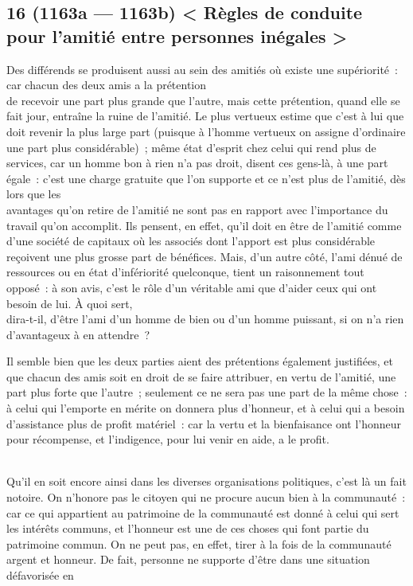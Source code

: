 \documentclass[french,twoside]{book} %
\begin{document}
\subsection[{16 (1163a — 1163b) < Règles de conduite pour l’amitié entre personnes inégales >}]{16 (1163a — 1163b) < Règles de conduite pour l’amitié entre personnes inégales >}
\noindent Des différends se produisent aussi au sein des amitiés où existe une supériorité : car chacun des deux amis a la prétention \\
de recevoir une part plus grande que l’autre, mais cette prétention, quand elle se fait jour, entraîne la ruine de l’amitié. Le plus vertueux estime que c’est à lui que doit revenir la plus large part (puisque à l’homme vertueux on assigne d’ordinaire une part plus considérable) ; même état d’esprit chez celui qui rend plus de services, car un homme bon à rien n’a pas droit, disent ces gens-là, à une part égale : c’est une charge gratuite que l’on supporte et ce n’est plus de l’amitié, dès lors que les \\
avantages qu’on retire de l’amitié ne sont pas en rapport avec l’importance du travail qu’on accomplit. Ils pensent, en effet, qu’il doit en être de l’amitié comme d’une société de capitaux où les associés dont l’apport est plus considérable reçoivent une plus grosse part de bénéfices. Mais, d’un autre côté, l’ami dénué de ressources ou en état d’infériorité quelconque, tient un raisonnement tout opposé : à son avis, c’est le rôle d’un véritable ami que d’aider ceux qui ont besoin de lui. À quoi sert, \\
dira-t-il, d’être l’ami d’un homme de bien ou d’un homme puissant, si on n’a rien d’avantageux à en attendre ?\par
 Il semble bien que les deux parties aient des prétentions également justifiées, et que chacun des amis soit en droit de se faire attribuer, en vertu de l’amitié, une part plus forte que l’autre ; seulement ce ne sera pas une part de la même chose : à celui qui l’emporte en mérite on donnera plus d’honneur, et à celui qui a besoin d’assistance plus de profit matériel : car la vertu et la bienfaisance ont l’honneur pour récompense, et l’indigence, pour lui venir en aide, a le profit.\par
\\
Qu’il en soit encore ainsi dans les diverses organisations politiques, c’est là un fait notoire. On n’honore pas le citoyen qui ne procure aucun bien à la communauté : car ce qui appartient au patrimoine de la communauté est donné à celui qui sert les intérêts communs, et l’honneur est une de ces choses qui font partie du patrimoine commun. On ne peut pas, en effet, tirer à la fois de la communauté argent et honneur. De fait, personne ne supporte d’être dans une situation défavorisée en \\
\end{document}

